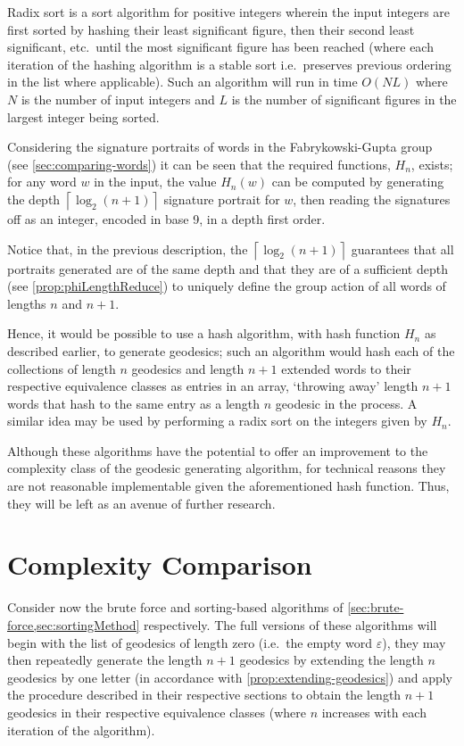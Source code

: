 Radix sort is a sort algorithm for positive integers wherein the input integers are first sorted by hashing their least significant figure, then their second least significant, etc.\ until the most significant figure has been reached (where each iteration of the hashing algorithm is a stable sort i.e.\ preserves previous ordering in the list where applicable).
Such an algorithm will run in time $O(N  L)$ where $N$ is the number of input integers and $L$ is the number of significant figures in the largest integer being sorted.

Considering the signature portraits of words in the Fabrykowski-Gupta group (see \cref{sec:comparing-words}) it can be seen that the required functions, $H_n$, exists;
for any word $w$ in the input, the value $H_n(w)$ can be computed by generating the depth $\left\lceil \log_2(n+1) \right\rceil$ signature portrait for $w$, then reading the signatures off as an integer, encoded in base 9, in a depth first order.

Notice that, in the previous description, the $\left\lceil \log_2(n+1) \right\rceil$ guarantees that all portraits generated are of the same depth and that they are of a sufficient depth (see \cref{prop:phiLengthReduce}) to uniquely define the group action of all words of lengths $n$ and $n+1$.

Hence, it would be possible to use a hash algorithm, with hash function $H_n$ as described earlier, to generate geodesics; such an algorithm would hash each of the collections of length $n$ geodesics and length $n+1$ extended words to their respective equivalence classes as entries in an array, `throwing away' length $n+1$ words that hash to the same entry as a length $n$ geodesic in the process.
A similar idea may be used by performing a radix sort on the integers given by $H_n$.

Although these algorithms have the potential to offer an improvement to the complexity class of the geodesic generating algorithm, for technical reasons they are not reasonable implementable given the aforementioned hash function.
Thus, they will be left as an avenue of further research.

\section{Complexity Comparison}
\label{sec:complexity-comparison}

Consider now the brute force and sorting-based algorithms of \cref{sec:brute-force,sec:sortingMethod} respectively.
The full versions of these algorithms will begin with the list of geodesics of length zero (i.e.\ the empty word $\varepsilon$), they may then repeatedly generate the length $n+1$ geodesics by extending the length $n$ geodesics by one letter (in accordance with \cref{prop:extending-geodesics}) and apply the procedure described in their respective sections to obtain the length $n+1$ geodesics in their respective equivalence classes (where $n$ increases with each iteration of the algorithm).


